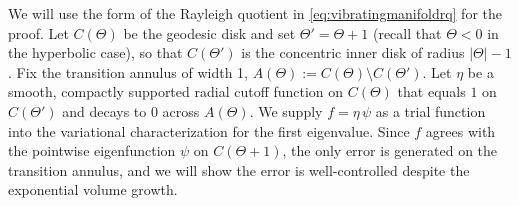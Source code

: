 \documentclass[11pt]{amsart}
\theoremstyle{definition}
\numberwithin{equation}{section}
\begin{document}
We will use the form of the Rayleigh quotient in \eqref{eq:vibratingmanifoldrq} for the proof. Let $C(\Theta)$ be the geodesic disk and set $\Theta'=\Theta+1$ (recall that $\Theta<0$ in the hyperbolic case), so that $C(\Theta')$ is the concentric inner disk of radius $|\Theta|-1$. Fix the transition annulus of width 1,
$A(\Theta) := C(\Theta)\setminus C(\Theta')$. Let $\eta$ be a smooth, compactly supported radial cutoff function on $C(\Theta)$ that equals $1$ on $C(\Theta')$ and decays to 0 across $A(\Theta)$.  We supply $f = \eta \, \psi$ as a trial function into the variational characterization for the first eigenvalue. Since $f$ agrees with the pointwise eigenfunction $\psi$ on $C(\Theta+1)$, the only error is generated on the transition annulus, and we will show the error is well-controlled despite the exponential volume growth.
\end{document}
